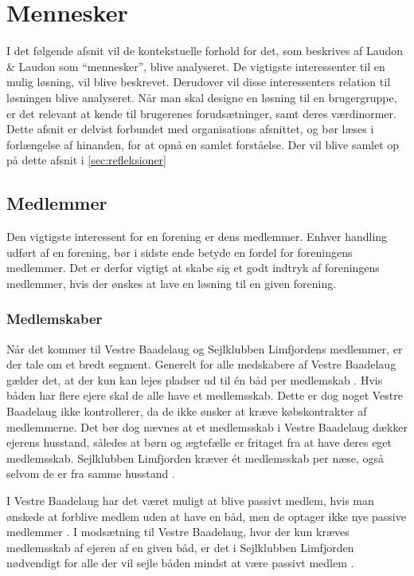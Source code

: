 \section{Mennesker}

I det følgende afsnit vil de kontekstuelle forhold for det, som beskrives af Laudon \& Laudon som \enquote{mennesker}, blive analyseret. De vigtigste interessenter til en mulig løsning, vil blive beskrevet. Derudover vil disse interessenters relation til løsningen blive analyseret. Når man skal designe en løsning til en brugergruppe, er det relevant at kende til brugerenes forudsætninger, samt deres værdinormer. Dette afsnit er delvist forbundet med organisations afsnittet, og bør læses i forlængelse af hinanden, for at opnå en samlet forståelse. Der vil blive samlet op på dette afsnit i \cref{sec:refleksioner}

\subsection{Medlemmer}

Den vigtigste interessent for en forening er dens medlemmer. Enhver handling udført af en forening, bør i sidste ende betyde en fordel for foreningens medlemmer. Det er derfor vigtigt at skabe sig et godt indtryk af foreningens medlemmer, hvis der ønskes at lave en løsning til en given forening.

\subsubsection{Medlemskaber}

Når det kommer til Vestre Baadelaug og Sejlklubben Limfjordens medlemmer, er der tale om et bredt segment. Generelt for alle medskabere af Vestre Baadelaug gælder det, at der kun kan lejes pladser ud til én båd per medlemskab \cite{vestre_vedtagter}. Hvis båden har flere ejere skal de alle have et medlemsskab. Dette er dog noget Vestre Baadelaug ikke kontrollerer, da de ikke ønsker at kræve købskontrakter af medlemmerne. Det bør dog nævnes at et medlemsskab i Vestre Baadelaug dækker ejerens husstand, således at børn og ægtefælle er fritaget fra at have deres eget medlemsskab. Sejlklubben Limfjorden kræver ét medlemsskab per næse, også selvom de er fra samme husstand \cite{int_vb_sl}.

I Vestre Baadelaug har det været muligt at blive passivt medlem, hvis man ønskede at forblive medlem uden at have en båd, men de optager ikke nye passive medlemmer \cite{vestre_vedtagter}. I modsætning til Vestre Baadelaug, hvor der kun kræves medlemsskab af ejeren af en given båd, er det i Sejlklubben Limfjorden nødvendigt for alle der vil sejle båden mindst at være passivt medlem \cite{int_vb_sl}.

